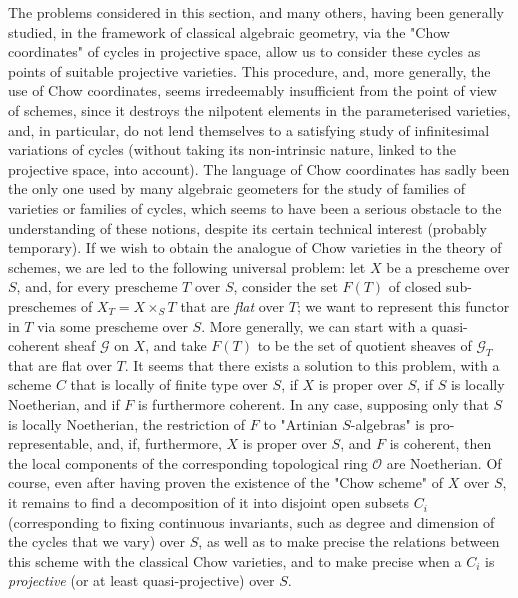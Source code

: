 \begin{remark}\label{fga3.ii-c.2-remarks}
    The problems considered in this section, and many others, having been generally studied, in the framework of classical algebraic geometry, via the "Chow coordinates" of cycles in projective space, allow us to consider these cycles as points of suitable projective varieties.
    This procedure, and, more generally, the use of Chow coordinates, seems irredeemably insufficient from the point of view of schemes, since it destroys the nilpotent elements in the parameterised varieties, and, in particular, do not lend themselves to a satisfying study of infinitesimal variations of cycles (without taking its non-intrinsic nature, linked to the projective space, into account).
    The language of Chow coordinates has sadly been the only one used by many algebraic geometers for the study of families of varieties or families of cycles, which seems to have been a serious obstacle to the understanding of these notions, despite its certain technical interest (probably temporary).
    If we wish to obtain the analogue of Chow varieties in the theory of schemes, we are led to the following universal problem:
    let $X$ be a prescheme over $S$, and, for every prescheme $T$ over $S$, consider the set $F(T)$ of closed sub-preschemes of $X_T=X\times_S T$ that are \emph{flat} over $T$; we want to represent this functor in $T$ via some prescheme over $S$.
    More generally, we can start with a quasi-coherent sheaf $\mathcal{G}$ on $X$, and take $F(T)$ to be the set of quotient sheaves of $\mathcal{G}_T$ that are flat over $T$.
    It seems that there exists a solution to this problem, with a scheme $C$ that is locally of finite type over $S$, if $X$ is proper over $S$, if $S$ is locally Noetherian, and if $F$ is furthermore coherent.
    In any case, supposing only that $S$ is locally Noetherian, the restriction of $F$ to "Artinian $S$-algebras" is pro-representable, and, if, furthermore, $X$ is proper over $S$, and $F$ is coherent, then the local components of the corresponding topological ring $\mathcal{O}$ are Noetherian.
    Of course, even after having proven the existence of the "Chow scheme" of $X$ over $S$, it remains to find a decomposition of it into disjoint open subsets $C_i$ (corresponding to fixing continuous invariants, such as degree and dimension of the cycles that we vary) over $S$, as well as to make precise the relations between this scheme with the classical Chow varieties, and to make precise when a $C_i$ is \emph{projective} (or at least quasi-projective) over $S$.
\end{remark}

